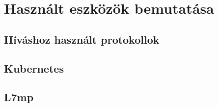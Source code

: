 \chapter{Használt eszközök bemutatása}

\section{Híváshoz használt protokollok}



\section{Kubernetes}

\section{L7mp}

